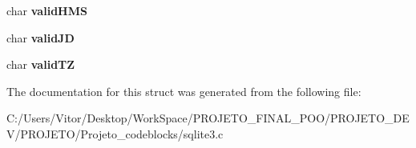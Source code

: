 \begin{DoxyCompactItemize}
\item 
\hypertarget{struct_date_time_aba26b32c6142cf6bfc09db3088b90add}{char {\bfseries valid\-H\-M\-S}}\label{struct_date_time_aba26b32c6142cf6bfc09db3088b90add}

\item 
\hypertarget{struct_date_time_a1962742892150a03dc5d302f43efbb04}{char {\bfseries valid\-J\-D}}\label{struct_date_time_a1962742892150a03dc5d302f43efbb04}

\item 
\hypertarget{struct_date_time_af3dfda2bdbb2183dc1b94f449701b81e}{char {\bfseries valid\-T\-Z}}\label{struct_date_time_af3dfda2bdbb2183dc1b94f449701b81e}

\end{DoxyCompactItemize}


The documentation for this struct was generated from the following file\-:\begin{DoxyCompactItemize}
\item 
C\-:/\-Users/\-Vitor/\-Desktop/\-Work\-Space/\-P\-R\-O\-J\-E\-T\-O\-\_\-\-F\-I\-N\-A\-L\-\_\-\-P\-O\-O/\-P\-R\-O\-J\-E\-T\-O\-\_\-\-D\-E\-V/\-P\-R\-O\-J\-E\-T\-O/\-Projeto\-\_\-codeblocks/sqlite3.\-c\end{DoxyCompactItemize}
